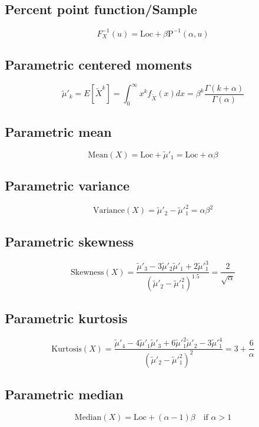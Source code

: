 \documentclass{article}
\begin{document}
\subsection{Percent point function/Sample}
\begin{equation*} F^{-1}_{X}\left(u\right)=\text{Loc}+\beta \text{P}^{-1}\left(\alpha,u\right) \end{equation*}
\subsection{Parametric centered moments}
\begin{equation*} \tilde{\mu}'_{k}=E[\tilde{X}^k]=\int_{0}^{\infty}x^{k}f_{\tilde{X}}\left(x\right)dx=\beta^k\frac{\Gamma(k+\alpha)}{\Gamma(\alpha)} \end{equation*}
\subsection{Parametric mean}
\begin{equation*} \mathrm{Mean}(X)=\text{Loc}+\tilde{\mu}'_{1}=\text{Loc}+\alpha \beta \end{equation*}
\subsection{Parametric variance}
\begin{equation*} \mathrm{Variance}(X)=\tilde{\mu}'_{2}-\tilde{\mu}'^{2}_{1}=\alpha \beta^2 \end{equation*}
\subsection{Parametric skewness}
\begin{equation*} \mathrm{Skewness}(X)=\frac{\tilde{\mu}'_{3}-3\tilde{\mu}'_{2}\tilde{\mu}'_{1}+2\tilde{\mu}'^{3}_{1}}{(\tilde{\mu}'_{2}-\tilde{\mu}'^{2}_{1})^{1.5}}=\frac{2}{\sqrt{\alpha}} \end{equation*}
\subsection{Parametric kurtosis}
\begin{equation*} \mathrm{Kurtosis}(X)=\frac{\tilde{\mu}'_{4}-4\tilde{\mu}'_{1}\tilde{\mu}'_{3}+6\tilde{\mu}'^{2}_{1}\tilde{\mu}'_{2}-3\tilde{\mu}'^{4}_{1}}{(\tilde{\mu}'_{2}-\tilde{\mu}'^{2}_{1})^{2}}=3+\frac{6}{\alpha} \end{equation*}
\subsection{Parametric median}
\begin{equation*} \mathrm{Median}(X)=\text{Loc}+(\alpha-1)\beta \quad \text{if }\alpha>1 \end{equation*}
\end{document}
